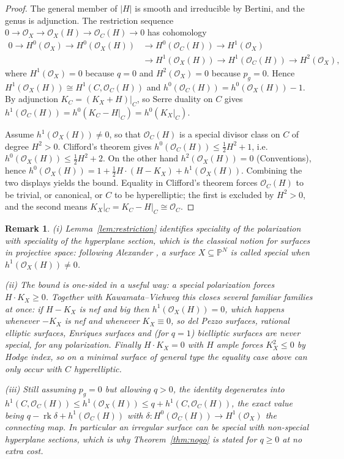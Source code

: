 \documentclass[10pt,a4paper]{amsart}
\newtheorem{remark}[theorem]{Remark}
\newcommand{\OO}{\mathcal{O}}
\newcommand{\PP}{\mathbb{P}}
\begin{document}
\begin{proof}
The general member of $|H|$ is smooth and irreducible by Bertini, and the genus is adjunction. The restriction sequence $0\to\OO_X\to\OO_X(H)\to\OO_C(H)\to0$ has cohomology
\[
\begin{aligned}
0\to H^0(\OO_X)\to H^0(\OO_X(H))&\to H^0(\OO_C(H))\to H^1(\OO_X)\\
&\to H^1(\OO_X(H))\to H^1(\OO_C(H))\to H^2(\OO_X),
\end{aligned}
\]
where $H^1(\OO_X)=0$ because $q=0$ and $H^2(\OO_X)=0$ because $p_g=0$. Hence $H^1(\OO_X(H))\cong H^1(C,\OO_C(H))$ and $h^0(\OO_C(H))=h^0(\OO_X(H))-1$. By adjunction $K_C=(K_X+H)|_C$, so Serre duality on $C$ gives $h^1(\OO_C(H))=h^0(K_C-H|_C)=h^0(K_X|_C)$.

Assume $h^1(\OO_X(H))\neq0$, so that $\OO_C(H)$ is a special divisor class on $C$ of degree $H^2>0$. Clifford's theorem gives $h^0(\OO_C(H))\le\tfrac12H^2+1$, i.e.\ $h^0(\OO_X(H))\le\tfrac12H^2+2$. On the other hand $h^2(\OO_X(H))=0$ (Conventions), hence $h^0(\OO_X(H))=1+\tfrac12H\cdot(H-K_X)+h^1(\OO_X(H))$. Combining the two displays yields the bound. Equality in Clifford's theorem forces $\OO_C(H)$ to be trivial, or canonical, or $C$ to be hyperelliptic; the first is excluded by $H^2>0$, and the second means $K_X|_C=K_C-H|_C\cong\OO_C$.
\end{proof}

\begin{remark}\label{rem:restriction}
(i) Lemma~\ref{lem:restriction} identifies speciality of the polarization with speciality of the hyperplane section, which is the classical notion for surfaces in projective space: following Alexander \cite{Al88,Al92}, a surface $X\subseteq\PP^N$ is called \emph{special} when $h^1(\OO_X(H))\neq0$.

(ii) The bound is one-sided in a useful way: a special polarization forces $H\cdot K_X\ge0$. Together with Kawamata--Viehweg this closes several familiar families at once: if $H-K_X$ is nef and big then $h^1(\OO_X(H))=0$, which happens whenever $-K_X$ is nef and whenever $K_X\equiv0$, so del Pezzo surfaces, rational elliptic surfaces, Enriques surfaces and (for $q=1$) bielliptic surfaces are never special, for any polarization. Finally $H\cdot K_X=0$ with $H$ ample forces $K_X^2\le0$ by Hodge index, so on a minimal surface of general type the equality case above can only occur with $C$ hyperelliptic.

(iii) Still assuming $p_g=0$ but allowing $q>0$, the identity degenerates into $h^1(C,\OO_C(H))\le h^1(\OO_X(H))\le q+h^1(C,\OO_C(H))$, the exact value being $q-\operatorname{rk}\delta+h^1(\OO_C(H))$ with $\delta:H^0(\OO_C(H))\to H^1(\OO_X)$ the connecting map. In particular an irregular surface can be special with non-special hyperplane sections, which is why Theorem~\ref{thm:nogo} is stated for $q\ge0$ at no extra cost.
\end{remark}
\end{document}
